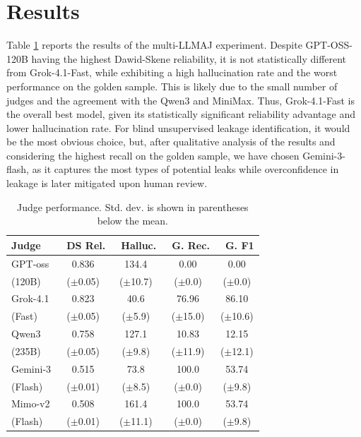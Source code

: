 \documentclass[11pt]{article}
\begin{document}
\section{Results}
Table \ref{tab:judge_performance_stacked} reports the results of the multi-LLMAJ experiment. Despite GPT-OSS-120B having the highest Dawid-Skene reliability, it is not statistically different from Grok-4.1-Fast, while exhibiting a high hallucination rate and the worst performance on the golden sample. This is likely due to the small number of judges and the agreement with the Qwen3 and MiniMax. Thus, Grok-4.1-Fast is the overall best model, given its statistically significant reliability advantage and lower hallucination rate. For blind unsupervised leakage identification, it would be the most obvious choice, but, after qualitative analysis of the results and considering the highest recall on the golden sample, we have chosen Gemini-3-flash, as it captures the most types of potential leaks while overconfidence in leakage is later mitigated upon human review.
\begin{table}[t]
\centering
\caption{Judge performance. Std. dev. is shown in parentheses below the mean.}
\label{tab:judge_performance_stacked}
\setlength{\tabcolsep}{3pt}
\begin{tabular}{lcccc}
\hline
\textbf{Judge} & \ \textbf{DS Rel.} & \ \textbf{Halluc.} & \ \textbf{G. Rec.} & \ \textbf{G. F1} \\
\hline
GPT-oss & 0.836 & 134.4 & 0.00 & 0.00 \\[-0.5ex]
\scriptsize{(120B)} & \scriptsize{($\pm$0.05)} & \scriptsize{($\pm$10.7)} & \scriptsize{($\pm$0.0)} & \scriptsize{($\pm$0.0)} \\
\hline
Grok-4.1 & 0.823 & 40.6 & 76.96 & 86.10 \\[-0.5ex]
\scriptsize{(Fast)} & \scriptsize{($\pm$0.05)} & \scriptsize{($\pm$5.9)} & \scriptsize{($\pm$15.0)} & \scriptsize{($\pm$10.6)} \\
\hline
Qwen3 & 0.758 & 127.1 & 10.83 & 12.15 \\[-0.5ex]
\scriptsize{(235B)} & \scriptsize{($\pm$0.05)} & \scriptsize{($\pm$9.8)} & \scriptsize{($\pm$11.9)} & \scriptsize{($\pm$12.1)} \\
\hline
Gemini-3 & 0.515 & 73.8 & 100.0 & 53.74 \\[-0.5ex]
\scriptsize{(Flash)} & \scriptsize{($\pm$0.01)} & \scriptsize{($\pm$8.5)} & \scriptsize{($\pm$0.0)} & \scriptsize{($\pm$9.8)} \\
\hline
Mimo-v2 & 0.508 & 161.4 & 100.0 & 53.74 \\[-0.5ex]
\scriptsize{(Flash)} & \scriptsize{($\pm$0.01)} & \scriptsize{($\pm$11.1)} & \scriptsize{($\pm$0.0)} & \scriptsize{($\pm$9.8)} \\
\hline
\end{tabular}
\end{table}
\end{document}
